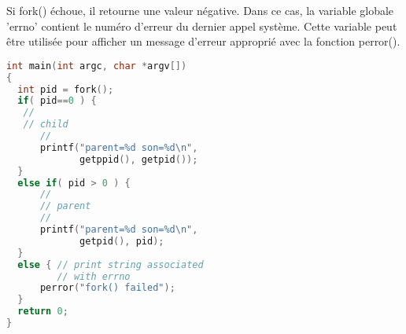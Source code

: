 \documentclass[12pt]{report}
\begin{document}
Si fork() échoue, il retourne une valeur négative. Dans ce cas, la variable globale 'errno' contient le numéro d'erreur du dernier appel système. Cette variable peut être utilisée pour afficher un message d'erreur approprié avec la fonction perror().
\begin{lstlisting}[language=C]
int main(int argc, char *argv[])
{
  int pid = fork();
  if( pid==0 ) {
   //
   // child
      //
      printf("parent=%d son=%d\n",
             getppid(), getpid());
  }
  else if( pid > 0 ) {
      //
      // parent
      //
      printf("parent=%d son=%d\n",
             getpid(), pid);
  }
  else { // print string associated
         // with errno   
      perror("fork() failed");
  }
  return 0;
}
\end{lstlisting}
\end{document}
